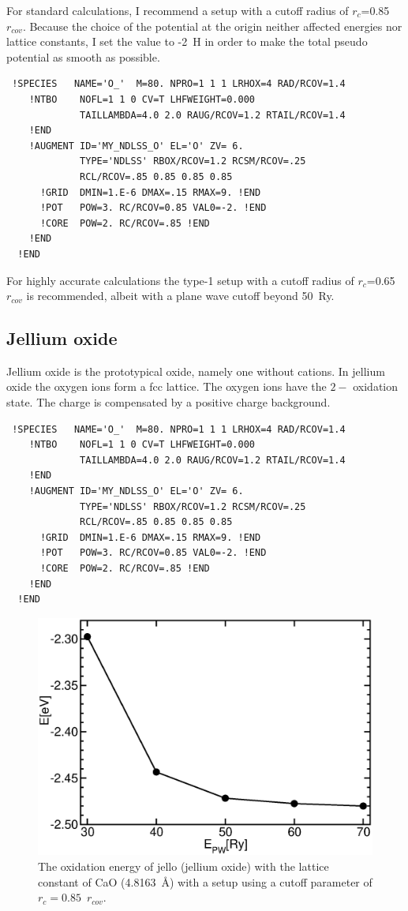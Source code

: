 \documentclass[11pt,a4paper]{report}
\begin{document}
For standard calculations, I recommend a setup with a cutoff radius of
$r_c$=0.85~$r_{cov}$. Because the choice of the potential at the
origin neither affected energies nor lattice constants, I set the
value to -2~H in order to make the total pseudo potential as smooth
as possible.
\begin{verbatim}
 !SPECIES   NAME='O_'  M=80. NPRO=1 1 1 LRHOX=4 RAD/RCOV=1.4
    !NTBO    NOFL=1 1 0 CV=T LHFWEIGHT=0.000
             TAILLAMBDA=4.0 2.0 RAUG/RCOV=1.2 RTAIL/RCOV=1.4 
    !END 
    !AUGMENT ID='MY_NDLSS_O' EL='O' ZV= 6.
             TYPE='NDLSS' RBOX/RCOV=1.2 RCSM/RCOV=.25
             RCL/RCOV=.85 0.85 0.85 0.85
      !GRID  DMIN=1.E-6 DMAX=.15 RMAX=9. !END
      !POT   POW=3. RC/RCOV=0.85 VAL0=-2. !END
      !CORE  POW=2. RC/RCOV=.85 !END
    !END
  !END
\end{verbatim}

 For highly accurate calculations the
type-1 setup with a cutoff radius of $r_c$=0.65~$r_{cov}$ is
recommended, albeit with a plane wave cutoff beyond 50~Ry.


\subsection{Jellium oxide}
Jellium oxide is the prototypical oxide, namely one without
cations. In jellium oxide the oxygen ions form a fcc lattice. The
oxygen ions have the $2-$ oxidation state. The charge is compensated
by a positive charge background.

{\tiny\begin{verbatim}
 !SPECIES   NAME='O_'  M=80. NPRO=1 1 1 LRHOX=4 RAD/RCOV=1.4
    !NTBO    NOFL=1 1 0 CV=T LHFWEIGHT=0.000
             TAILLAMBDA=4.0 2.0 RAUG/RCOV=1.2 RTAIL/RCOV=1.4 
    !END 
    !AUGMENT ID='MY_NDLSS_O' EL='O' ZV= 6.
             TYPE='NDLSS' RBOX/RCOV=1.2 RCSM/RCOV=.25
             RCL/RCOV=.85 0.85 0.85 0.85
      !GRID  DMIN=1.E-6 DMAX=.15 RMAX=9. !END
      !POT   POW=3. RC/RCOV=0.85 VAL0=-2. !END
      !CORE  POW=2. RC/RCOV=.85 !END
    !END
  !END
\end{verbatim}}

\begin{figure}[h!]
\begin{center}
\includegraphics[width=0.45\linewidth,clip=true]
{Figs/Jello/eoxjello.eps}
\end{center}
\caption{\label{eoxjello} The oxidation energy of jello (jellium
  oxide) with the lattice constant of CaO (4.8163~{\AA}) with a setup
  using a cutoff parameter of $r_c=0.85$~$r_{cov}$.  }
\end{figure}
\end{document}
